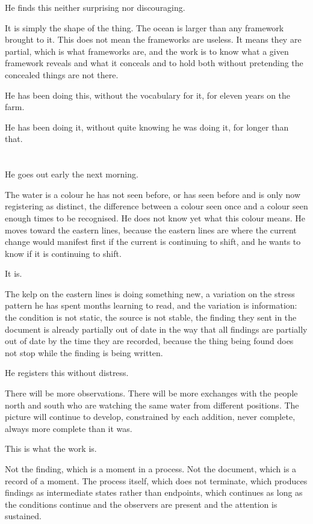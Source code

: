 He finds this neither surprising nor discouraging.

It is simply the shape of the thing. The ocean
is larger than any framework brought to it. This
does not mean the frameworks are useless. It means
they are partial, which is what frameworks are,
and the work is to know what a given framework
reveals and what it conceals and to hold both
without pretending the concealed things are not there.

He has been doing this, without the vocabulary
for it, for eleven years on the farm.

He has been doing it, without quite knowing he
was doing it, for longer than that.

\section{}

He goes out early the next morning.

The water is a colour he has not seen before,
or has seen before and is only now registering
as distinct, the difference between a colour
seen once and a colour seen enough times to be
recognised. He does not know yet what this colour
means. He moves toward the eastern lines, because
the eastern lines are where the current change
would manifest first if the current is continuing
to shift, and he wants to know if it is continuing
to shift.

It is.

The kelp on the eastern lines is doing something
new, a variation on the stress pattern he has
spent months learning to read, and the variation
is information: the condition is not static, the
source is not stable, the finding they sent in
the document is already partially out of date
in the way that all findings are partially out
of date by the time they are recorded, because
the thing being found does not stop while the
finding is being written.

He registers this without distress.

There will be more observations. There will be
more exchanges with the people north and south
who are watching the same water from different
positions. The picture will continue to develop,
constrained by each addition, never complete,
always more complete than it was.

This is what the work is.

Not the finding, which is a moment in a process.
Not the document, which is a record of a moment.
The process itself, which does not terminate,
which produces findings as intermediate states
rather than endpoints, which continues as long
as the conditions continue and the observers
are present and the attention is sustained.

